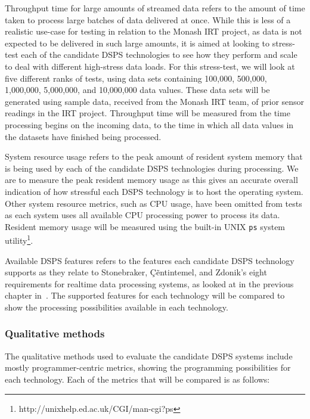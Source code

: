 Throughput time for large amounts of streamed data refers to the amount of time taken to process large batches of data
delivered at once. While this is less of a realistic use-case for testing in relation to the Monash IRT project, as data
is not expected to be delivered in such large amounts, it is aimed at looking to stress-test each of the candidate DSPS
technologies to see how they perform and scale to deal with different high-stress data loads. For this stress-test, we
will look at five different ranks of tests, using data sets containing 100,\@000, 500,\@000, 1,\@000,\@000, 5,\@000,\@000, and
10,\@000,\@000 data values. These data sets will be generated using sample data, received from the Monash IRT team, of
prior sensor readings in the IRT project. Throughput time will be measured from the time processing begins on the incoming
data, to the time in which all data values in the datasets have finished being processed.

System resource usage refers to the peak amount of resident system memory that is being used by each of the candidate DSPS
technologies during processing. We are to measure the peak resident memory usage as this gives an accurate overall indication of
how stressful each DSPS technology is to host the operating system. Other system resource metrics, such as CPU usage, have
been omitted from tests as each system uses all available CPU processing power to process its data. Resident memory usage
will be measured using the built-in UNIX \texttt{ps} system utility\footnote{http://unixhelp.ed.ac.uk/CGI/man-cgi?ps}.

Available DSPS features refers to the features each candidate DSPS technology supports as they relate to Stonebraker,
\c{C}\~entintemel, and Zdonik's eight requirements for realtime data processing systems, as looked at in the previous
chapter in~. The supported features for each technology will be compared to show the
processing possibilities available in each technology.



\subsubsection{Qualitative methods} %
\label{ssub:qualitative_methods}

The qualitative methods used to evaluate the candidate DSPS systems include mostly programmer-centric metrics, showing the
programming possibilities for each technology. Each of the metrics that will be compared is as follows:

